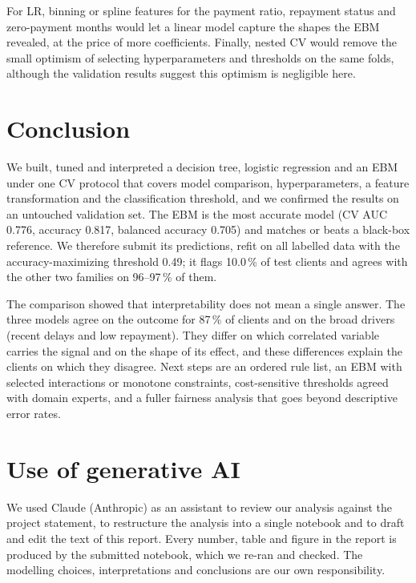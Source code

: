 \documentclass[a4paper,11pt]{article}
\begin{document}
For LR, binning or spline features for the payment ratio, repayment status and zero-payment months would let a linear model capture the shapes the EBM revealed, at the price of more coefficients. Finally, nested CV would remove the small optimism of selecting hyperparameters and thresholds on the same folds, although the validation results suggest this optimism is negligible here.

\section{Conclusion}
We built, tuned and interpreted a decision tree, logistic regression and an EBM under one CV protocol that covers model comparison, hyperparameters, a feature transformation and the classification threshold, and we confirmed the results on an untouched validation set. The EBM is the most accurate model (CV AUC 0.776, accuracy 0.817, balanced accuracy 0.705) and matches or beats a black-box reference. We therefore submit its predictions, refit on all labelled data with the accuracy-maximizing threshold 0.49; it flags 10.0\,\% of test clients and agrees with the other two families on 96--97\,\% of them.

The comparison showed that interpretability does not mean a single answer. The three models agree on the outcome for 87\,\% of clients and on the broad drivers (recent delays and low repayment). They differ on which correlated variable carries the signal and on the shape of its effect, and these differences explain the clients on which they disagree. Next steps are an ordered rule list, an EBM with selected interactions or monotone constraints, cost-sensitive thresholds agreed with domain experts, and a fuller fairness analysis that goes beyond descriptive error rates.


\section*{Use of generative AI}
We used Claude (Anthropic) as an assistant to review our analysis against the project statement, to restructure the analysis into a single notebook and to draft and edit the text of this report. Every number, table and figure in the report is produced by the submitted notebook, which we re-ran and checked. The modelling choices, interpretations and conclusions are our own responsibility.
\end{document}
